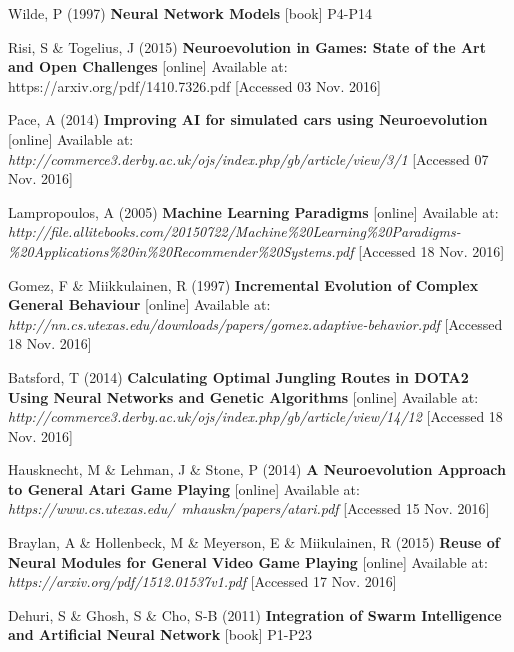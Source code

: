 \documentclass[12pt,a4paper]{article}
\begin{document}
\begin{thebibliography}{10}

	Wilde, P
	(1997)
	\textbf{Neural Network Models}
	[book]
	P4-P14

	Risi, S \& Togelius, J
	(2015)
	\textbf{Neuroevolution in Games: State of the Art and Open Challenges}
  	[online]
  	Available at: https://arxiv.org/pdf/1410.7326.pdf
  	[Accessed 03 Nov. 2016]

	Pace, A
	(2014)
	\textbf{Improving AI for simulated cars using Neuroevolution}
	[online]
	Available at: \textit{http://commerce3.derby.ac.uk/ojs/index.php/gb/article/view/3/1}
	[Accessed 07 Nov. 2016]
	
	Lampropoulos, A
	(2005)
	\textbf{Machine Learning Paradigms}
	[online]
	Available at: \textit{http://file.allitebooks.com/20150722/Machine\%20Learning\%20Paradigms-\%20Applications\%20in\%20Recommender\%20Systems.pdf}
	[Accessed 18 Nov. 2016]
  
	Gomez, F \& Miikkulainen, R
	(1997)
	\textbf{Incremental Evolution of Complex General Behaviour}
	[online]
	Available at: \textit{http://nn.cs.utexas.edu/downloads/papers/gomez.adaptive-behavior.pdf}
	[Accessed 18 Nov. 2016]
	
	Batsford, T
	(2014)
	\textbf{Calculating Optimal Jungling Routes in DOTA2 Using Neural Networks and Genetic Algorithms}
	[online]
	Available at: \textit{http://commerce3.derby.ac.uk/ojs/index.php/gb/article/view/14/12}
	[Accessed 18 Nov. 2016]
	
	Hausknecht, M \& Lehman, J \& Stone, P
	(2014)
	\textbf{A Neuroevolution Approach to General Atari Game Playing}
	[online]
	Available at: \textit{https://www.cs.utexas.edu/~mhauskn/papers/atari.pdf}
	[Accessed 15 Nov. 2016]
	
	Braylan, A \& Hollenbeck, M \& Meyerson, E \& Miikulainen, R
	(2015)
	\textbf{Reuse of Neural Modules for General Video Game Playing}
	[online]
	Available at: \textit{https://arxiv.org/pdf/1512.01537v1.pdf}
	[Accessed 17 Nov. 2016]
	
	Dehuri, S \& Ghosh, S \& Cho, S-B
	(2011)
	\textbf{Integration of Swarm Intelligence and Artificial Neural Network}
	[book]
	P1-P23

\end{thebibliography}
\end{document}
